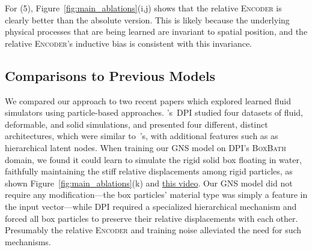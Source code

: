 \documentclass{article}
\newcommand\figref[1]{Figure~\ref{#1}}
\newcommand\domain[1]{\textsc{#1}}
\newcommand{\encoder}{\textsc{Encoder}}
\newcommand\vidboxbath[1]{\href{http://tny.sh/mrOkfpg}{#1}}
\begin{document}
For (5), \figref{fig:main_ablations}(i,j) shows that the relative \encoder{} is clearly better than the absolute version. This is likely because the underlying physical processes that are being learned are invariant to spatial position, and the relative \encoder{}'s inductive bias is consistent with this invariance.



\subsection{Comparisons to Previous Models}
\label{sec:results:baselines}

We compared our approach to two recent papers which explored learned fluid simulators using particle-based approaches. \citet{li2018learning}'s~DPI studied four datasets of fluid, deformable, and solid simulations, and presented four different, distinct architectures, which were similar to~\citet{sanchez2018graph}'s, with additional features such as as hierarchical latent nodes. 
%
When training our GNS model on DPI's \domain{BoxBath} domain, we found it could learn to simulate the rigid solid box floating in water, faithfully maintaining the stiff relative displacements among rigid particles, as shown \figref{fig:main_ablations}(k) and \vidboxbath{this video}. Our GNS model did not require any modification---the box particles' material type was simply a feature in the input vector---while DPI required a specialized hierarchical mechanism and forced all box particles to preserve their relative displacements with each other. Presumably the relative \encoder{} and training noise alleviated the need for such mechanisms.

%
%
%
%
%
%
\end{document}

